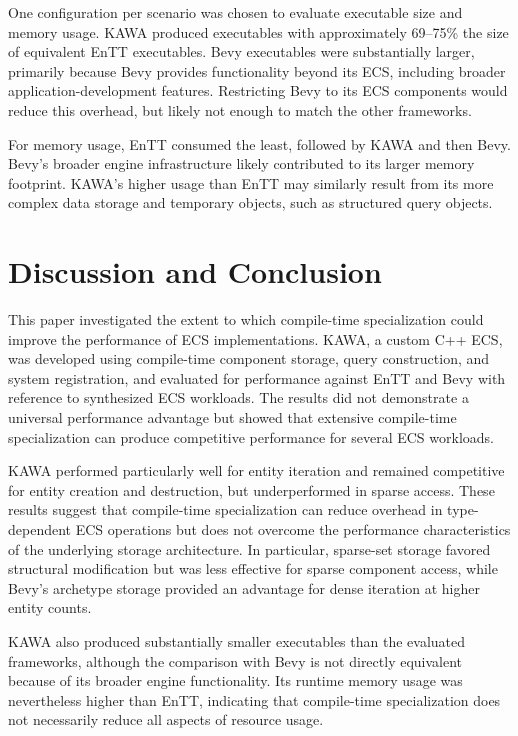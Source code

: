 \documentclass[conference]{IEEEtran}
\begin{document}
    One configuration per scenario was chosen to evaluate executable size and memory usage.
    KAWA produced executables with approximately 69–75\% the size of equivalent EnTT executables.
    Bevy executables were substantially larger, primarily because Bevy provides functionality beyond its ECS, including broader application-development features.
    Restricting Bevy to its ECS components would reduce this overhead, but likely not enough to match the other frameworks.

    For memory usage, EnTT consumed the least, followed by KAWA and then Bevy.
    Bevy's broader engine infrastructure likely contributed to its larger memory footprint.
    KAWA's higher usage than EnTT may similarly result from its more complex data storage and temporary objects, such as structured query objects.

    \section{Discussion and Conclusion}
    \label{sec:conclusion}

    This paper investigated the extent to which compile-time specialization could improve the performance of ECS implementations.
    KAWA, a custom C++ ECS, was developed using compile-time component storage, query construction, and system registration,
    and evaluated for performance against EnTT and Bevy with reference to synthesized ECS workloads.
    The results did not demonstrate a universal performance advantage but showed that extensive compile-time specialization
    can produce competitive performance for several ECS workloads.

    KAWA performed particularly well for entity iteration and remained competitive for entity
    creation and destruction, but underperformed in sparse access.
    These results suggest that compile-time specialization can reduce overhead in type-dependent ECS operations
    but does not overcome the performance characteristics of the underlying storage architecture.
    In particular, sparse-set storage favored structural modification but was less effective for sparse component access,
    while Bevy's archetype storage provided an advantage for dense iteration at higher entity counts.

    KAWA also produced substantially smaller executables than the evaluated frameworks,
    although the comparison with Bevy is not directly equivalent because of its broader engine functionality.
    Its runtime memory usage was nevertheless higher than EnTT, indicating that compile-time specialization
    does not necessarily reduce all aspects of resource usage.
\end{document}

